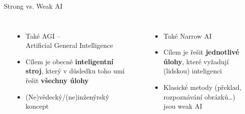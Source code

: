 
\begin{frame}{Strong vs. Weak AI}

    \begin{columns}[t]
        \begin{center}
        \end{center}

        \vspace{5pt}

        \begin{itemize}

            \item<2-> Také AGI -- \\ \quad Artificial General Intelligence

            \item<3-> Cílem je obecně \textbf{inteligentní stroj}, který v důsledku
			    toho umí řešit \textbf{všechny úlohy}

            \item<4-> (Ne)vědecký/(ne)inženýrský koncept

        \end{itemize}


        \begin{center}
        \end{center}

        \vspace{5pt}

        \begin{itemize}

            \item<6-> Také Narrow AI

            \item<7-> Cílem je řešit \textbf{jednotlivé úlohy}, které vyžadují
					(lidskou) inteligenci

            \item<8-> Klasické metody (překlad, rozpoznávání obrázků\ldots) jsou weak AI

        \end{itemize}

    \end{columns}

    \vspace{10pt}


\end{frame}

